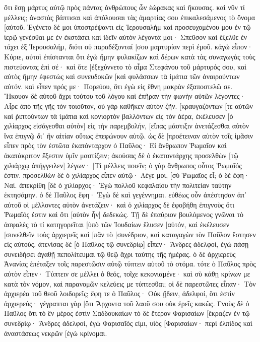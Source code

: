 ὅτι ἔσῃ μάρτυς αὐτῷ πρὸς πάντας ἀνθρώπους ὧν ἑώρακας καὶ ἤκουσας. 
καὶ νῦν τί μέλλεις; ἀναστὰς βάπτισαι καὶ ἀπόλουσαι τὰς ἁμαρτίας σου ἐπικαλεσάμενος τὸ ὄνομα [αὐτοῦ. 
Ἐγένετο δέ μοι ὑποστρέψαντι εἰς Ἰερουσαλὴμ καὶ προσευχομένου μου ἐν τῷ ἱερῷ γενέσθαι με ἐν ἐκστάσει 
καὶ ἰδεῖν αὐτὸν λέγοντά μοι· Σπεῦσον καὶ ἔξελθε ἐν τάχει ἐξ Ἰερουσαλήμ, διότι οὐ παραδέξονταί [σου μαρτυρίαν περὶ ἐμοῦ. 
κἀγὼ εἶπον· Κύριε, αὐτοὶ ἐπίστανται ὅτι ἐγὼ ἤμην φυλακίζων καὶ δέρων κατὰ τὰς συναγωγὰς τοὺς πιστεύοντας ἐπὶ σέ· 
καὶ ὅτε [ἐξεχύννετο τὸ αἷμα Στεφάνου τοῦ μάρτυρός σου, καὶ αὐτὸς ἤμην ἐφεστὼς καὶ συνευδοκῶν [καὶ φυλάσσων τὰ ἱμάτια τῶν ἀναιρούντων αὐτόν. 
καὶ εἶπεν πρός με· Πορεύου, ὅτι ἐγὼ εἰς ἔθνη μακρὰν ἐξαποστελῶ σε. 
Ἤκουον δὲ αὐτοῦ ἄχρι τούτου τοῦ λόγου καὶ ἐπῆραν τὴν φωνὴν αὐτῶν λέγοντες· Αἶρε ἀπὸ τῆς γῆς τὸν τοιοῦτον, οὐ γὰρ καθῆκεν αὐτὸν ζῆν. 
[κραυγαζόντων [τε αὐτῶν καὶ ῥιπτούντων τὰ ἱμάτια καὶ κονιορτὸν βαλλόντων εἰς τὸν ἀέρα, 
ἐκέλευσεν [ὁ χιλίαρχος εἰσάγεσθαι αὐτὸν] εἰς τὴν παρεμβολήν, [εἴπας μάστιξιν ἀνετάζεσθαι αὐτὸν ἵνα ἐπιγνῷ δι᾽ ἣν αἰτίαν οὕτως ἐπεφώνουν αὐτῷ. 
ὡς δὲ [προέτειναν αὐτὸν τοῖς ἱμᾶσιν εἶπεν πρὸς τὸν ἑστῶτα ἑκατόνταρχον ὁ Παῦλος· Εἰ ἄνθρωπον Ῥωμαῖον καὶ ἀκατάκριτον ἔξεστιν ὑμῖν μαστίζειν; 
ἀκούσας δὲ ὁ ἑκατοντάρχης προσελθὼν [τῷ χιλιάρχῳ ἀπήγγειλεν] λέγων· [Τί μέλλεις ποιεῖν; ὁ γὰρ ἄνθρωπος οὗτος Ῥωμαῖός ἐστιν. 
προσελθὼν δὲ ὁ χιλίαρχος εἶπεν αὐτῷ· Λέγε μοι, [σὺ Ῥωμαῖος εἶ; ὁ δὲ ἔφη· Ναί. 
ἀπεκρίθη [δὲ ὁ χιλίαρχος· Ἐγὼ πολλοῦ κεφαλαίου τὴν πολιτείαν ταύτην ἐκτησάμην. ὁ δὲ Παῦλος ἔφη· Ἐγὼ δὲ καὶ γεγέννημαι. 
εὐθέως οὖν ἀπέστησαν ἀπ᾽ αὐτοῦ οἱ μέλλοντες αὐτὸν ἀνετάζειν· καὶ ὁ χιλίαρχος δὲ ἐφοβήθη ἐπιγνοὺς ὅτι Ῥωμαῖός ἐστιν καὶ ὅτι [αὐτὸν ἦν] δεδεκώς. 
Τῇ δὲ ἐπαύριον βουλόμενος γνῶναι τὸ ἀσφαλὲς τὸ τί κατηγορεῖται [ὑπὸ τῶν Ἰουδαίων ἔλυσεν [αὐτόν, καὶ ἐκέλευσεν [συνελθεῖν τοὺς ἀρχιερεῖς καὶ [πᾶν τὸ [συνέδριον, καὶ καταγαγὼν τὸν Παῦλον ἔστησεν εἰς αὐτούς. 
ἀτενίσας δὲ [ὁ Παῦλος τῷ συνεδρίῳ] εἶπεν· Ἄνδρες ἀδελφοί, ἐγὼ πάσῃ συνειδήσει ἀγαθῇ πεπολίτευμαι τῷ θεῷ ἄχρι ταύτης τῆς ἡμέρας. 
ὁ δὲ ἀρχιερεὺς Ἁνανίας ἐπέταξεν τοῖς παρεστῶσιν αὐτῷ τύπτειν αὐτοῦ τὸ στόμα. 
τότε ὁ Παῦλος πρὸς αὐτὸν εἶπεν· Τύπτειν σε μέλλει ὁ θεός, τοῖχε κεκονιαμένε· καὶ σὺ κάθῃ κρίνων με κατὰ τὸν νόμον, καὶ παρανομῶν κελεύεις με τύπτεσθαι; 
οἱ δὲ παρεστῶτες εἶπαν· Τὸν ἀρχιερέα τοῦ θεοῦ λοιδορεῖς; 
ἔφη τε ὁ Παῦλος· Οὐκ ᾔδειν, ἀδελφοί, ὅτι ἐστὶν ἀρχιερεύς· γέγραπται γὰρ [ὅτι Ἄρχοντα τοῦ λαοῦ σου οὐκ ἐρεῖς κακῶς. 
Γνοὺς δὲ ὁ Παῦλος ὅτι τὸ ἓν μέρος ἐστὶν Σαδδουκαίων τὸ δὲ ἕτερον Φαρισαίων [ἔκραζεν ἐν τῷ συνεδρίῳ· Ἄνδρες ἀδελφοί, ἐγὼ Φαρισαῖός εἰμι, υἱὸς [Φαρισαίων· περὶ ἐλπίδος καὶ ἀναστάσεως νεκρῶν [ἐγὼ κρίνομαι. 
